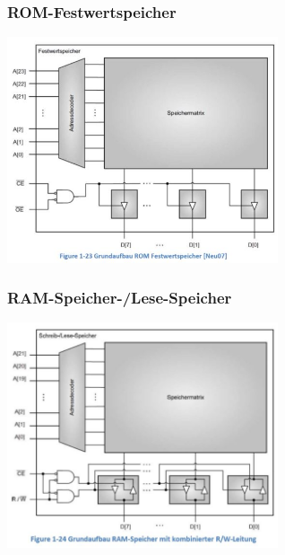 \begin{multicols}{2}
\subsubsection{ROM-Festwertspeicher}
\includegraphics[width=8cm]{images/ROM}

\subsubsection{RAM-Speicher-/Lese-Speicher}
\includegraphics[width=8cm]{images/RAM}
\end{multicols}

